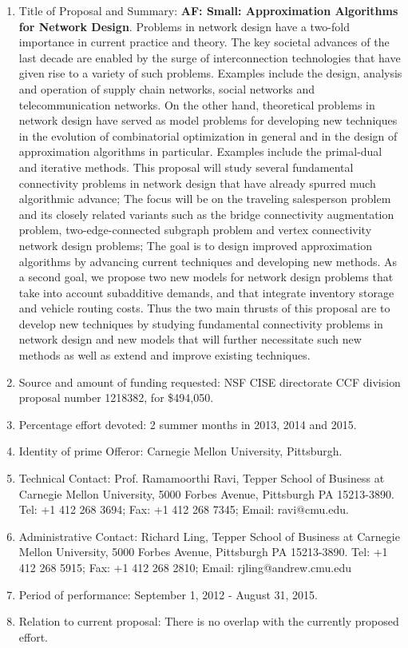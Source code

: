 \begin{enumerate}
\item Title of Proposal and Summary: {\bf AF: Small: Approximation Algorithms for Network Design}. Problems in network design have a two-fold importance in current practice and theory. The key societal advances of the last decade are enabled by the surge of interconnection technologies that have given rise to a variety of such problems. Examples include the design, analysis and operation of supply chain networks, social networks and telecommunication networks. On the other hand, theoretical problems in network design have served as model problems for developing new techniques in the evolution of combinatorial optimization in general and in the design of approximation algorithms in particular. Examples include the primal-dual and iterative methods. This proposal will study several fundamental connectivity problems in network design that have already spurred much algorithmic advance; The focus will be on the traveling salesperson problem and its closely related variants such as the bridge connectivity augmentation problem, two-edge-connected subgraph problem and vertex connectivity network design problems; The goal is to design improved approximation algorithms by advancing current techniques and developing new methods. As a second goal, we propose two new models for network design problems that take into account subadditive demands, and that integrate inventory storage and vehicle routing costs. Thus the two main thrusts of this proposal are to develop new techniques by studying fundamental connectivity problems in network design and new models that will further necessitate such new methods as well as extend and improve existing techniques.
\item Source and amount of funding requested: NSF CISE directorate CCF division proposal number 1218382, for \$494,050.
\item Percentage effort devoted: 2 summer months in 2013, 2014 and 2015.
\item Identity of prime Offeror: Carnegie Mellon University, Pittsburgh.
\item Technical Contact: Prof. Ramamoorthi Ravi,  Tepper School of Business at
 Carnegie Mellon University,  5000 Forbes Avenue, Pittsburgh PA 15213-3890.  Tel: +1 412 268 3694;  Fax: +1 412 268 7345;  Email: ravi@cmu.edu.
\item Administrative Contact: Richard Ling, Tepper School of Business at
 Carnegie Mellon University,  5000 Forbes Avenue, Pittsburgh PA 15213-3890. Tel: +1 412 268 5915; Fax: +1 412 268 2810; Email: rjling@andrew.cmu.edu
\item  Period of performance: September 1, 2012 - August 31, 2015.
\item Relation to current proposal: There is no overlap with the currently proposed effort.
\end{enumerate}

